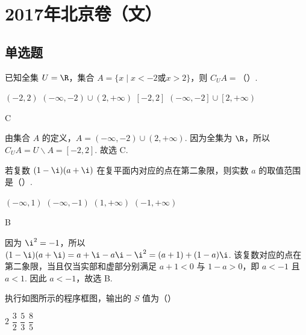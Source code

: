 
\chapter{2017年北京卷（文）}

\section{单选题}

\begin{problem}
已知全集 \(U=\R\)，集合 \(A=\{x\mid x<-2\text{或}x>2\}\)，则 \(C_UA=\)（\quad）.

\choices
    {\(\left(-2,2\right)\)}
    {\(\left(-\infty,-2\right)\cup\left(2,+\infty\right)\)}
    {\(\left[-2,2\right]\)}
    {\(\left(-\infty,-2\right]\cup\left[2,+\infty\right)\)}
\end{problem}

\begin{answer}
C
\end{answer}

\begin{solution}
由集合 \(A\) 的定义，\(A=(-\infty,-2)\cup(2,+\infty)\). 因为全集为 \(\R\)，所以 \(C_UA=U\mathbin{\backslash}A=[-2,2]\). 故选 C.
\end{solution}

\begin{problem}
若复数 \((1-\i)(a+\i)\) 在复平面内对应的点在第二象限，则实数 \(a\) 的取值范围是（\quad）.

\choices
    {\(\left(-\infty,1\right)\)}
    {\(\left(-\infty,-1\right)\)}
    {\(\left(1,+\infty\right)\)}
    {\(\left(-1,+\infty\right)\)}
\end{problem}

\begin{answer}
B
\end{answer}

\begin{solution}
因为 \(\i^2=-1\)，所以
\((1-\i)(a+\i)=a+\i-a\i-\i^2=(a+1)+(1-a)\i\).
该复数对应的点在第二象限，当且仅当实部和虚部分别满足 \(a+1<0\) 与 \(1-a>0\)，即 \(a<-1\) 且 \(a<1\). 因此 \(a<-1\)，故选 B.
\end{solution}

\begin{problem}
执行如图所示的程序框图，输出的 \(S\) 值为（\quad）


\choices
    {\(2\)}
    {\(\dfrac32\)}
    {\(\dfrac53\)}
    {\(\dfrac85\)}
\end{problem}

